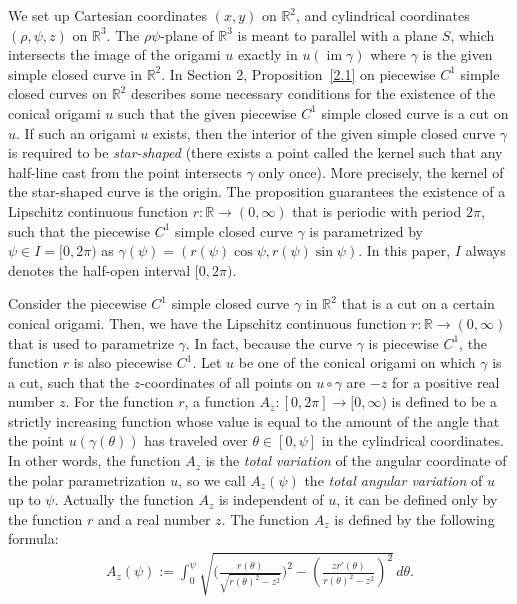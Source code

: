\documentclass{amsart}
\theoremstyle{plain}
\theoremstyle{definition}
\theoremstyle{remark}
\DeclareMathOperator{\im}{im}
\begin{document}
We set up Cartesian coordinates $(x,y)$ on $\mathbb{R}^2$, and cylindrical coordinates $(\rho,\psi,z)$ on $\mathbb{R}^3$.
The $\rho\psi$-plane of $\mathbb{R}^3$ is meant to parallel with a plane $S$, which intersects the image of the origami $u$ exactly in $u(\im\gamma)$ where $\gamma$ is the given simple closed curve in $\mathbb{R}^2$. %
In Section 2, Proposition~\ref{2.1} on piecewise $C^1$ simple closed curves on $\mathbb{R}^2$ describes some necessary conditions for the existence of the conical origami $u$ such that the given piecewise $C^1$ simple closed curve is a cut on $u$. %
If such an origami $u$ exists, then the interior of the given simple closed curve $\gamma$ is required to be \emph{star-shaped} (there exists a point called the kernel such that any half-line cast from the point intersects $\gamma$ only once).
More precisely, the kernel of the star-shaped curve is the origin.
The proposition guarantees the existence of a Lipschitz continuous function $r \colon \mathbb{R}\to(0,\infty)$ that is periodic with period $2\pi$, such that the piecewise $C^1$ simple closed curve $\gamma$ is parametrized by $\psi\in I=[0,2\pi)$ as $\gamma(\psi)=(r(\psi)\cos\psi,r(\psi)\sin\psi)$. %
In this paper, $I$ always denotes the half-open interval $[0,2\pi)$.

Consider the piecewise $C^1$ simple closed curve $\gamma$ in $\mathbb{R}^2$ that is a cut on a certain conical origami.
Then, we have the Lipschitz continuous function $r \colon \mathbb{R}\to(0,\infty)$ that is used to parametrize $\gamma$.
In fact, because the curve $\gamma$ is piecewise $C^1$, the function $r$ is also piecewise $C^1$.
Let $u$ be one of the conical origami on which $\gamma$ is a cut, such that the $z$-coordinates of all points on $u\circ\gamma$ are $-z$ for a positive real number $z$. %
For the function $r$, a function $A_z \colon [0,2\pi]\to[0,\infty)$ is defined to be a strictly increasing function whose value is equal to the amount of the angle that the point $u(\gamma(\theta))$ has traveled over $\theta\in[0,\psi]$ in the cylindrical coordinates.
In other words, the function $A_z$ is the \emph{total variation} of the angular coordinate of the polar parametrization $u$, so we call $A_z(\psi)$ the \emph{total angular variation} of $u$ up to $\psi$.
Actually the function $A_z$ is independent of $u$, it can be defined only by the function $r$ and a real number $z$.
The function $A_z$ is defined by the following formula:
\begin{align*}
A_z(\psi):=\int_0^{\psi}\sqrt{\biggl(\frac{r(\theta)}{\sqrt{r(\theta)^2-z^2}}\biggr)^2-\left(\frac{zr'(\theta)}{r(\theta)^2-z^2}\right)^2}\,d\theta.
\end{align*}
\end{document}
